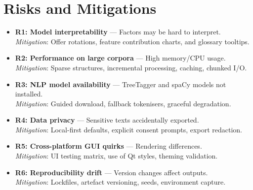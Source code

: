 \section{Risks and Mitigations}
\begin{itemize}
    \item \textbf{R1: Model interpretability} — Factors may be hard to interpret. \\
          \emph{Mitigation}: Offer rotations, feature contribution charts, and glossary tooltips.
    \item \textbf{R2: Performance on large corpora} — High memory/CPU usage. \\
          \emph{Mitigation}: Sparse structures, incremental processing, caching, chunked I/O.
    \item \textbf{R3: NLP model availability} — TreeTagger and spaCy models not installed. \\
          \emph{Mitigation}: Guided download, fallback tokenisers, graceful degradation.
    \item \textbf{R4: Data privacy} — Sensitive texts accidentally exported. \\
          \emph{Mitigation}: Local-first defaults, explicit consent prompts, export redaction.
    \item \textbf{R5: Cross-platform GUI quirks} — Rendering differences. \\
          \emph{Mitigation}: UI testing matrix, use of Qt styles, theming validation.
    \item \textbf{R6: Reproducibility drift} — Version changes affect outputs. \\
          \emph{Mitigation}: Lockfiles, artefact versioning, seeds, environment capture.
\end{itemize}

